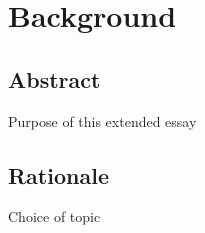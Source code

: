 
\chapter{Background} %

\label{Background} %


\section{Abstract}

Purpose of this extended essay

\section{Rationale}

Choice of topic